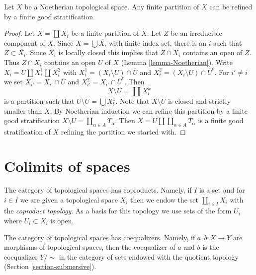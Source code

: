 \begin{lemma}
\label{lemma-noetherian-partition-refined-by-stratification}
Let $X$ be a Noetherian topological space. Any finite partition
of $X$ can be refined by a finite good stratification.
\end{lemma}

\begin{proof}
Let $X = \coprod X_i$ be a finite partition of $X$.
Let $Z$ be an irreducible component of $X$. Since $X = \bigcup \overline{X_i}$
with finite index set, there is an $i$ such that
$Z \subset \overline{X_i}$. Since $X_i$ is locally closed this
implies that $Z \cap X_i$ contains an open of $Z$. Thus
$Z \cap X_i$ contains an open $U$ of $X$ (Lemma \ref{lemma-Noetherian}).
Write $X_i = U \amalg X_i^1 \amalg X_i^2$ with
$X_i^1 = (X_i \setminus U) \cap \overline{U}$ and
$X_i^2 = (X_i \setminus U) \cap \overline{U}^c$.
For $i' \not = i$ we set
$X_{i'}^1 = X_{i'} \cap \overline{U}$ and
$X_{i'}^2 = X_{i'} \cap \overline{U}^c$.
Then
$$
X \setminus U = \coprod X^k_l
$$
is a partition such that $\overline{U} \setminus U = \bigcup X_l^1$.
Note that $X \setminus U$ is closed and strictly smaller than $X$.
By Noetherian induction we can refine this partition
by a finite good stratification
$X \setminus U = \coprod_{\alpha \in A} T_\alpha$.
Then $X = U \amalg \coprod_{\alpha \in A} T_\alpha$ is a finite
good stratification of $X$ refining the partition we started with.
\end{proof}







\section{Colimits of spaces}
\label{section-colimits}

\noindent
The category of topological spaces has coproducts. Namely, if $I$ is a set
and for $i \in I$ we are given a topological space $X_i$ then we endow
the set $\coprod_{i \in I} X_i$ with the {\it coproduct topology}.
As a basis for this topology we use sets of the form $U_i$ where
$U_i \subset X_i$ is open.

\medskip\noindent
The category of topological spaces has coequalizers. Namely, if
$a, b : X \to Y$ are morphisms of topological spaces, then the
coequalizer of $a$ and $b$ is the coequalizer $Y/\sim$ in the category
of sets endowed with the quotient topology (Section \ref{section-submersive}).

